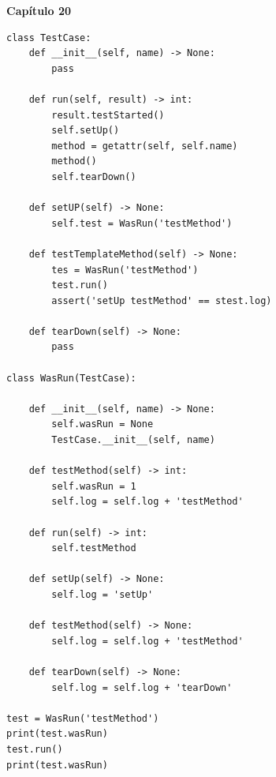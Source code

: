 \documentclass[a4paper,12pt]{article}
\newcommand{\capitulo}[1]{
    \vspace{1em}
    \noindent
    \colorbox{black!15}{
        \parbox{\dimexpr\linewidth-2\fboxsep}{
            \centering \Large \textbf{#1}
        }
    }
    \vspace{1em}
}
\begin{document}
\capitulo{Capítulo 20}
\begin{lstlisting}[style=pythonstyle]
class TestCase:
    def __init__(self, name) -> None:
        pass

    def run(self, result) -> int:
        result.testStarted()
        self.setUp()
        method = getattr(self, self.name)
        method()
        self.tearDown()

    def setUP(self) -> None:
        self.test = WasRun('testMethod')

    def testTemplateMethod(self) -> None:
        tes = WasRun('testMethod')
        test.run()
        assert('setUp testMethod' == stest.log)

    def tearDown(self) -> None:
        pass

class WasRun(TestCase):

    def __init__(self, name) -> None:
        self.wasRun = None 
        TestCase.__init__(self, name)

    def testMethod(self) -> int:
        self.wasRun = 1
        self.log = self.log + 'testMethod'

    def run(self) -> int:
        self.testMethod

    def setUp(self) -> None:
        self.log = 'setUp' 

    def testMethod(self) -> None:
        self.log = self.log + 'testMethod' 

    def tearDown(self) -> None:
        self.log = self.log + 'tearDown' 

test = WasRun('testMethod')
print(test.wasRun)
test.run()
print(test.wasRun)
\end{lstlisting}
\end{document}
